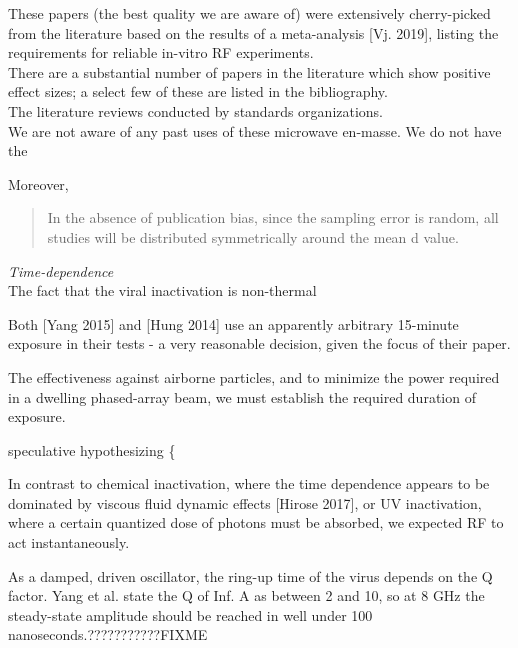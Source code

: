 \documentclass[fleqn,10pt]{article}
\begin{document}
\begin{autem}

These papers (the best quality we are aware of) were extensively cherry-picked from the literature based on the results of a meta-analysis [Vj. 2019], listing the requirements for reliable in-vitro RF experiments.\\


There are a substantial number of papers in the literature which show positive effect sizes; a select few of these are listed in the bibliography. \\

The literature reviews conducted by standards organizations.\\

We are not aware of any past uses of these microwave en-masse. We do not have the 

Moreover, 
\begin{quote}
	
In the absence of publication bias, since the sampling error is random, all studies will be distributed symmetrically around the mean d value.

\end{quote}


\end{autem}

\clearpage
\printbibliography[heading=none, title={}, keyword={standards}]



\clearpage
{\Large \it Time-dependence}\\

The fact that the viral inactivation is non-thermal

Both [Yang 2015] and [Hung 2014] use an apparently arbitrary 15-minute exposure in their tests - a very reasonable decision, given the focus of their paper. 

The effectiveness against airborne particles, and to minimize the power required in a dwelling phased-array beam, we must establish the required duration of exposure.

{\color{red} speculative hypothesizing \{ } 

In contrast to chemical inactivation, where the time dependence appears to be dominated by viscous fluid dynamic effects [Hirose 2017], or UV inactivation, where a certain quantized dose of photons must be absorbed, we expected RF to act instantaneously.

As a damped, driven oscillator, the ring-up time of the virus depends on the Q factor. Yang et al. state the Q of Inf. A as between 2 and 10, so at 8 GHz the steady-state amplitude should be reached in well under 100 nanoseconds.???????????FIXME
\end{document}
